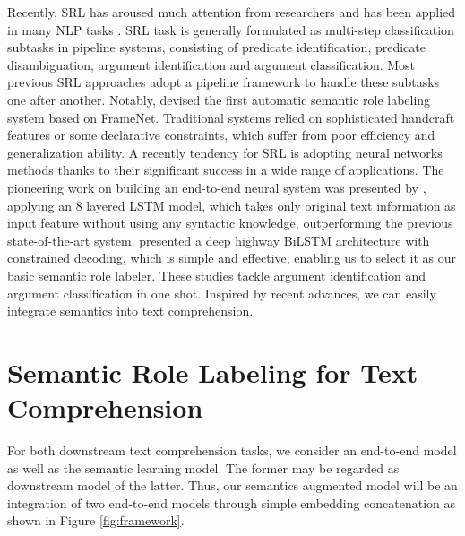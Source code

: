 \documentclass[11pt]{article}
\begin{document}
Recently, SRL has aroused much attention from researchers and has been applied in many NLP tasks \citep{Mihaylov2016Discourse,Shi2016Knowledge,Yih2016The}. SRL task is generally formulated as multi-step classification subtasks in pipeline systems, consisting of predicate identification, predicate disambiguation, argument identification and argument classification. Most previous SRL approaches adopt a pipeline framework to handle these subtasks one after another. Notably, \citet{Gildea2002Automatic}  devised the first automatic semantic role labeling system based on FrameNet. Traditional systems relied on sophisticated handcraft features or some declarative constraints, which suffer from poor efficiency and generalization ability. A recently tendency for SRL is adopting neural networks methods thanks to their significant success in a wide range of applications. The pioneering work on building an end-to-end neural system was presented by \citep{zhou-xu2015}, applying an 8 layered LSTM model, which takes only original text information as input feature without using any syntactic knowledge, outperforming the previous state-of-the-art system. \citet{He2017Deep} presented a deep highway BiLSTM architecture with constrained decoding, which is simple and effective, enabling us to select it as our basic semantic role labeler. These studies tackle argument identification and argument classification in one shot. Inspired by recent advances, we can easily integrate semantics into text comprehension. 




\iffalse
\citet{He2018Jointly} proposed an end-to-end approach for jointly predicting all predicates, arguments spans, and the relations between them. \citet{Marcheggiani2017A} also proposed a simple and accurate neural model using predicate specific  encodings  of a sentence and use them to predict arguments of the corresponding predicate. Without using any syntactic information, their approach achieved the state-of-the-art result on the CoNLL-2009 dataset. \citet{He2018Syntax} presented a simple and effective neural model  for dependency-based  SRL,  incorporating syntactic information with the proposed extended k-order pruning algorithm.  
\fi


\section{Semantic Role Labeling for Text Comprehension}

For both downstream text comprehension tasks, we consider an end-to-end model as well as the semantic learning model. The former may be regarded as downstream model of the latter. Thus, our semantics augmented model will be an integration of two end-to-end models through simple embedding concatenation as shown in Figure \ref{fig:framework}. 
\end{document}
